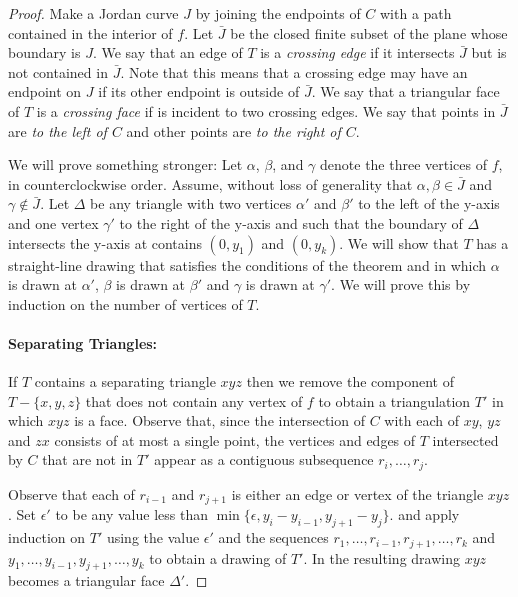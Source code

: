 \documentclass{patmorin}
\begin{document}
\begin{proof}
   Make a Jordan curve $J$ by joining the endpoints of $C$ with a path
   contained in the interior of $f$.  Let $\bar{J}$ be the closed finite
   subset of the plane whose boundary is $J$. We say that an edge of
   $T$ is a \emph{crossing edge} if it intersects $\bar{J}$ but is not
   contained in $\bar{J}$.  Note that this means that a crossing edge may
   have an endpoint on $J$ if its other endpoint is outside of $\bar{J}$.
   We say that a triangular face of $T$ is a \emph{crossing face} if
   is incident to two crossing edges.  We say that points in $\bar{J}$
   are \emph{to the left of $C$} and other points are \emph{to the right
   of $C$}.

   We will prove something stronger: Let $\alpha$, $\beta$, and $\gamma$
   denote the three vertices of $f$, in counterclockwise order.
   Assume, without loss of generality that $\alpha,\beta\in \bar{J}$
   and $\gamma\not\in\bar{J}$.  Let $\Delta$ be any triangle with two
   vertices $\alpha'$ and $\beta'$ to the left of the y-axis and one
   vertex $\gamma'$ to the right of the y-axis and such that the boundary
   of $\Delta$ intersects the y-axis at contains $(0,y_1)$ and $(0,y_k)$.
   We will show that $T$ has a straight-line drawing that satisfies the
   conditions of the theorem and in which $\alpha$ is drawn at $\alpha'$,
   $\beta$ is drawn at $\beta'$ and $\gamma$ is drawn at $\gamma'$.
   We will prove this by induction on the number of vertices of $T$.

   \paragraph{Separating Triangles:}
   If $T$ contains a separating triangle $xyz$ then we remove the
   component of $T-\{x,y,z\}$ that does not contain any vertex of $f$ to
   obtain a triangulation $T'$ in which $xyz$ is a face.  Observe that,
   since the intersection of $C$ with each of $xy$, $yz$ and $zx$
   consists of at most a single point, the vertices and edges of $T$
   intersected by $C$ that are not in $T'$ appear as a contiguous
   subsequence $r_i,\ldots,r_j$.

   Observe that each of $r_{i-1}$ and $r_{j+1}$ is either an edge
   or vertex of the triangle $xyz$.  Set $\epsilon'$ to be any
   value less than $\min\{\epsilon,y_{i}-y_{i-1}, y_{j+1}-y_j\}$.
   and apply induction on $T'$ using the value $\epsilon'$
   and the sequences $r_1,\ldots,r_{i-1},r_{j+1},\ldots,r_k$ and
   $y_1,\ldots,y_{i-1},y_{j+1},\ldots,y_k$ to obtain a drawing of $T'$.
   In the resulting drawing $xyz$ becomes a triangular face $\Delta'$.


\end{proof}
\end{document}
